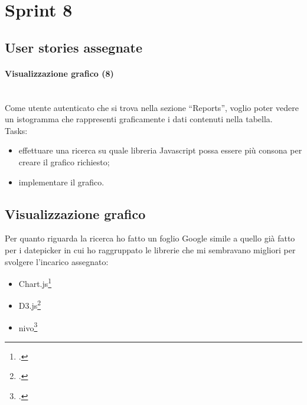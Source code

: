 
\section{Sprint 8}
\label{sec:sprint8}

\subsection{User stories assegnate}
\paragraph{Visualizzazione grafico (8)} \mbox{} \\[\baselineskip]
Come utente autenticato che si trova nella sezione “Reports”, voglio poter vedere un istogramma che rappresenti graficamente i dati contenuti nella tabella.\\

\noindent Tasks:
\begin{itemize}
  \item effettuare una ricerca su quale libreria Javascript possa essere più consona per creare il grafico richiesto;
  \item implementare il grafico.
\end{itemize}

\subsection{Visualizzazione grafico}
Per quanto riguarda la ricerca ho fatto un foglio Google simile a quello già fatto per i datepicker in cui ho raggruppato le librerie che mi sembravano migliori per svolgere l'incarico assegnato:

\begin{itemize}
  \item Chart.js\footcite{site:chartjs}
  \item D3.js\footcite{site:d3}
  \item nivo\footcite{site:nivo}
\end{itemize}

